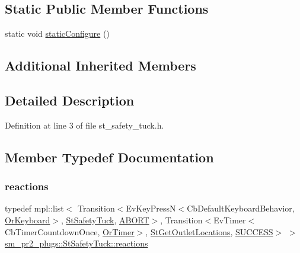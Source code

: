 \subsection*{Static Public Member Functions}
\begin{DoxyCompactItemize}
\item 
static void \hyperlink{structsm__pr2__plugs_1_1StSafetyTuck_a0682a377d9ef4f79963011de6e3acc9d}{static\+Configure} ()
\end{DoxyCompactItemize}
\subsection*{Additional Inherited Members}


\subsection{Detailed Description}


Definition at line 3 of file st\+\_\+safety\+\_\+tuck.\+h.



\subsection{Member Typedef Documentation}
\mbox{\label{structsm__pr2__plugs_1_1StSafetyTuck_a6162ef008d6b48278427d85e91a926c8}} 
\subsubsection{\texorpdfstring{reactions}{reactions}}
{\footnotesize\ttfamily typedef mpl\+::list$<$ Transition$<$Ev\+Key\+PressN$<$Cb\+Default\+Keyboard\+Behavior, \hyperlink{classsm__pr2__plugs_1_1OrKeyboard}{Or\+Keyboard}$>$, \hyperlink{structsm__pr2__plugs_1_1StSafetyTuck}{St\+Safety\+Tuck}, \hyperlink{classABORT}{A\+B\+O\+RT}$>$, Transition$<$Ev\+Timer$<$Cb\+Timer\+Countdown\+Once, \hyperlink{classsm__pr2__plugs_1_1OrTimer}{Or\+Timer}$>$, \hyperlink{structsm__pr2__plugs_1_1StGetOutletLocations}{St\+Get\+Outlet\+Locations}, \hyperlink{classSUCCESS}{S\+U\+C\+C\+E\+SS}$>$ $>$ \hyperlink{structsm__pr2__plugs_1_1StSafetyTuck_a6162ef008d6b48278427d85e91a926c8}{sm\+\_\+pr2\+\_\+plugs\+::\+St\+Safety\+Tuck\+::reactions}}



